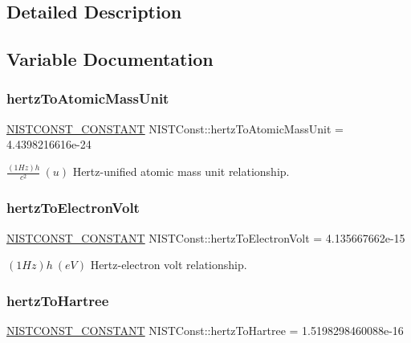 \subsection{Detailed Description}


\subsection{Variable Documentation}
\mbox{\label{group___n_i_s_t_const-_hertz_ga101854ed16b02843a3371f5fdf2a6384}} 
\subsubsection{\texorpdfstring{hertz\+To\+Atomic\+Mass\+Unit}{hertzToAtomicMassUnit}}
{\footnotesize\ttfamily \mbox{\hyperlink{_n_i_s_t_const_8hpp_a2b0fc1d7452373f816175dd86ce26729}{N\+I\+S\+T\+C\+O\+N\+S\+T\+\_\+\+C\+O\+N\+S\+T\+A\+NT}} N\+I\+S\+T\+Const\+::hertz\+To\+Atomic\+Mass\+Unit = 4.\+4398216616e-\/24}

$\frac{(1 Hz)h}{c^2} \ (u)$ Hertz-\/unified atomic mass unit relationship. \mbox{\label{group___n_i_s_t_const-_hertz_ga6ba385dcccd89bf01d4ee18c3464e0ea}} 
\subsubsection{\texorpdfstring{hertz\+To\+Electron\+Volt}{hertzToElectronVolt}}
{\footnotesize\ttfamily \mbox{\hyperlink{_n_i_s_t_const_8hpp_a2b0fc1d7452373f816175dd86ce26729}{N\+I\+S\+T\+C\+O\+N\+S\+T\+\_\+\+C\+O\+N\+S\+T\+A\+NT}} N\+I\+S\+T\+Const\+::hertz\+To\+Electron\+Volt = 4.\+135667662e-\/15}

$(1 Hz)h \ (eV)$ Hertz-\/electron volt relationship. \mbox{\label{group___n_i_s_t_const-_hertz_gadd5a8126aa55d959d52de9d86d9fe1d4}} 
\subsubsection{\texorpdfstring{hertz\+To\+Hartree}{hertzToHartree}}
{\footnotesize\ttfamily \mbox{\hyperlink{_n_i_s_t_const_8hpp_a2b0fc1d7452373f816175dd86ce26729}{N\+I\+S\+T\+C\+O\+N\+S\+T\+\_\+\+C\+O\+N\+S\+T\+A\+NT}} N\+I\+S\+T\+Const\+::hertz\+To\+Hartree = 1.\+5198298460088e-\/16}

